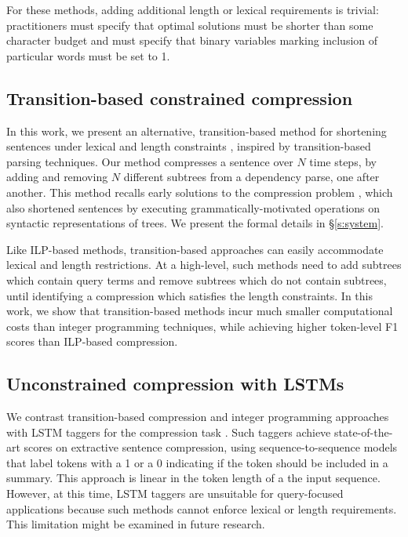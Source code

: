 \documentclass[11pt,a4paper]{article}
\begin{document}
For these methods, adding additional length or lexical requirements is trivial: practitioners must specify that optimal solutions must be shorter than some character budget and must specify that binary variables marking inclusion of particular words must be set to 1. 

\subsection{Transition-based constrained compression}

In this work, we present an alternative, transition-based method for shortening sentences under lexical and length constraints \cite{Earley1970AnEC,nivre2003}, inspired by transition-based parsing techniques. Our method compresses a sentence over $N$ time steps, by adding and removing $N$ different subtrees from a dependency parse, one after another. This method recalls early solutions to the compression problem \cite{Jing2000SentenceRF,Knight2000StatisticsBasedS}, which also shortened sentences by executing grammatically-motivated operations on syntactic representations of trees. We present the formal details in \S\ref{s:system}.

Like ILP-based methods, transition-based approaches can easily accommodate lexical and length restrictions. At a high-level, such methods need to add subtrees which contain query terms and remove subtrees which do not contain subtrees, until identifying a compression which satisfies the length constraints. In this work, we show that transition-based methods incur much smaller computational costs than integer programming techniques, while achieving higher token-level F1 scores than ILP-based compression.

\subsection{Unconstrained compression with LSTMs}

We contrast transition-based compression and integer programming approaches with LSTM taggers for the compression task \cite{filippova2015sentence}. Such taggers achieve state-of-the-art scores on extractive sentence compression, using sequence-to-sequence models that label tokens with a 1 or a 0 indicating if the token should be included in a summary. This approach is linear in the token length of a the input sequence. However, at this time, LSTM taggers are unsuitable for query-focused applications because such methods cannot enforce lexical or length requirements. This limitation might be examined in future research.
\end{document}

